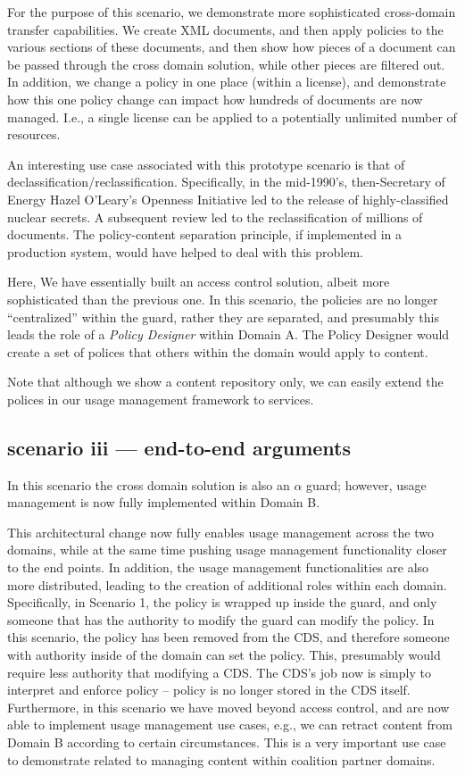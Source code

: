 For the purpose of this scenario, we demonstrate more sophisticated cross-domain transfer capabilities.  We create XML documents, and then apply policies to the various sections of these documents, and then show how pieces of a document can be passed through the cross domain solution, while other pieces are filtered out. In addition, we change a policy in one place (within a license), and demonstrate how this one policy change can impact how hundreds of documents are now managed. I.e., a single license can be applied to a potentially unlimited number of resources.

An interesting use case associated with this prototype scenario is that of
declassification/reclassification. Specifically, in the mid-1990’s, then-Secretary of Energy Hazel O’Leary’s Openness Initiative led to the release of highly-classified nuclear secrets. A subsequent review led to the reclassification of millions of documents.  The policy-content separation principle, if implemented in a production system, would have helped to deal with this problem.

Here, We have essentially built an access control solution, albeit more sophisticated than the previous one. In this scenario, the policies are no longer “centralized” within the guard, rather they are separated, and presumably this leads the role of a \textit{Policy Designer} within Domain A. The Policy Designer would create a set of polices that others within the domain would apply to content.

Note that although we show a content repository only, we can easily extend the polices in our usage management framework to services.

\subsection{scenario iii --- end-to-end arguments}
In this scenario the cross domain solution is also an $\alpha$ guard; however, usage management is now fully implemented within Domain B.

This architectural change now fully enables usage management across the two domains, while at the same time pushing usage management functionality closer to the end points. In addition, the usage management functionalities are also more distributed, leading to the creation of additional roles within each domain. Specifically, in Scenario 1, the policy is wrapped up inside the guard, and only someone that has the authority to modify the guard can modify the policy. In this scenario, the policy has been removed from the CDS, and therefore someone with authority inside of the domain can set the policy. This, presumably would require less authority that modifying a CDS. The CDS’s job now is simply to interpret and enforce policy – policy is no longer stored in the CDS itself. Furthermore, in this scenario we have moved beyond access control, and are now able to implement usage management use cases, e.g., we can retract content from Domain B according to certain circumstances. This is a very important use case to demonstrate related to managing content within coalition partner domains.

